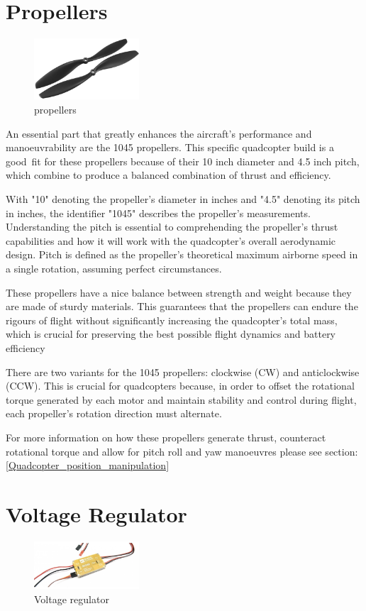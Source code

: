 \documentclass{report}
\begin{document}
\section{Propellers}
\begin{figure}[H]
  \centering
  \includegraphics[width=0.35\textwidth]{Pictures/props.png}
  \caption{propellers}
  \label{fig:propellers}
\end{figure}
An essential part that greatly enhances the aircraft's performance and
manoeuvrability are the 1045 propellers. This specific quadcopter build is a
good fit for these propellers because of their 10 inch diameter and 4.5 inch
pitch, which combine to produce a balanced combination of thrust and efficiency. 

With "10" denoting the propeller's diameter in inches and "4.5" denoting its
pitch in inches, the identifier "1045" describes the propeller's measurements.
Understanding the pitch is essential to comprehending the propeller's thrust
capabilities and how it will work with the quadcopter's overall aerodynamic
design. Pitch is defined as the propeller's theoretical maximum airborne speed
in a single rotation, assuming perfect circumstances.

These propellers have a nice balance between strength and weight because they
are made of sturdy materials. This guarantees that the propellers can endure the
rigours of flight without significantly increasing the quadcopter's total mass,
which is crucial for preserving the best possible flight dynamics and
battery efficiency 

There are two variants for the 1045 propellers: clockwise (CW) and anticlockwise
(CCW). This is crucial for quadcopters because, in order to offset the
rotational torque generated by each motor and maintain stability and control
during flight, each propeller's rotation direction must alternate.

For more information on how these propellers generate thrust, counteract
rotational torque and allow for pitch roll and yaw manoeuvres please see
section:\ref{Quadcopter_position_manipulation}
\section{Voltage Regulator}
\begin{figure}[H]
  \centering
  \includegraphics[width=0.35\textwidth]{Pictures/voltage_regulator.png}
  \caption{Voltage regulator}
  \label{fig:voltage_regulator}
\end{figure}
\end{document}
